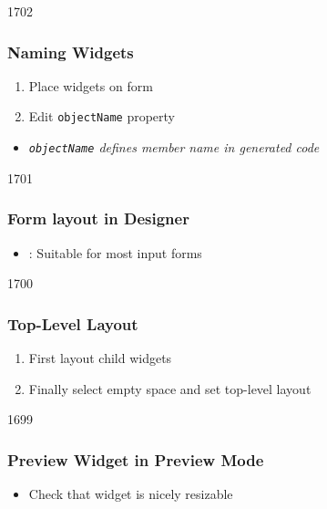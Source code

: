 \begin{slide}{1702}
\frametitle{Naming Widgets}
\begin{enumerate}
\item Place widgets on form
\item Edit \texttt{objectName} property
\end{enumerate}
\medskip
{}
\begin{itemize}
\item \textit{\texttt{objectName} defines member name in generated code}
\end{itemize}
\end{slide}

\begin{slide}[fragile]{1701}
\frametitle{Form layout in Designer}
\begin{itemize}
\item {}: Suitable for most input forms
\end{itemize}
\medskip
{}
\end{slide}

\begin{slide}[fragile]{1700}
\frametitle{Top-Level Layout}
\begin{enumerate}
\item First layout child widgets
\item Finally select empty space and set top-level layout
\end{enumerate}
\medskip
{}
\end{slide}

\begin{slide}[fragile]{1699}
\frametitle{Preview Widget in Preview Mode}
\begin{itemize}
\item Check that widget is nicely resizable
\end{itemize}
\medskip
{}    
\end{slide}


